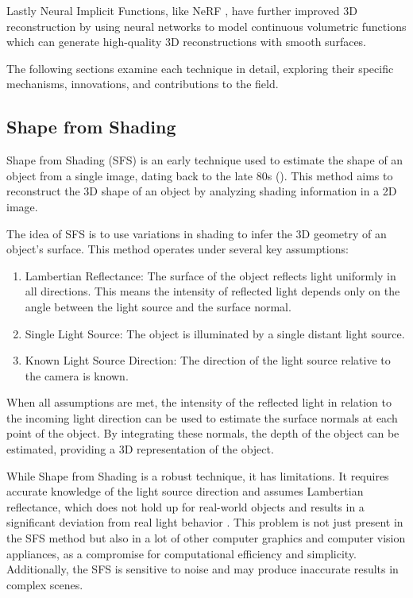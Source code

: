 Lastly Neural Implicit Functions, like NeRF \autocite{mildenhall_nerf_2021}, have further improved 3D reconstruction by using neural networks to model continuous volumetric functions which can generate high-quality 3D reconstructions with smooth surfaces.

The following sections examine each technique in detail, exploring their specific mechanisms, innovations, and contributions to the field.


\subsection{Shape from Shading}
Shape from Shading (SFS) is an early technique used to estimate the shape of an object from a single image, dating back to the late 80s (\textcite{horn_shape_1989}). This method aims to reconstruct the 3D shape of an object by analyzing shading information in a 2D image.

The idea of SFS is to use variations in shading to infer the 3D geometry of an object's surface. This method operates under several key assumptions:

\begin{enumerate}
    \item Lambertian Reflectance: The surface of the object reflects light uniformly in all directions. This means the intensity of reflected light depends only on the angle between the light source and the surface normal.
    \item Single Light Source: The object is illuminated by a single distant light source.
    \item Known Light Source Direction: The direction of the light source relative to the camera is known.
\end{enumerate}

When all assumptions are met, the intensity of the reflected light in relation to the incoming light direction can be used to estimate the surface normals at each point of the object. By integrating these normals, the depth of the object can be estimated, providing a 3D representation of the object.

While Shape from Shading is a robust technique, it has limitations. It requires accurate knowledge of the light source direction and assumes Lambertian reflectance, which does not hold up for real-world objects and results in a significant deviation from real light behavior \autocite{wolff_generalizing_1996}.
This problem is not just present in the SFS method but also in a lot of other computer graphics and computer vision appliances, as a compromise for computational efficiency and simplicity.
Additionally, the SFS is sensitive to noise and may produce inaccurate results in complex scenes.


